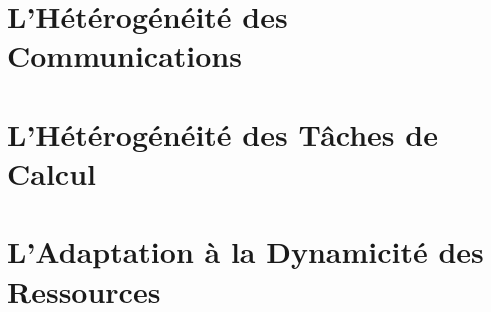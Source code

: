 \documentclass[final,twoside]{hdr} %
\begin{document}
%
%
%
%
%
%

\tableofcontents




\chapter{L'Hétérogénéité des Communications\label{chap:grids}}



\chapter{L'Hétérogénéité des Tâches de Calcul\label{chap:amide}}



\chapter{L'Adaptation à la Dynamicité des Ressources\label{chap:hadoop}}
\end{document}
